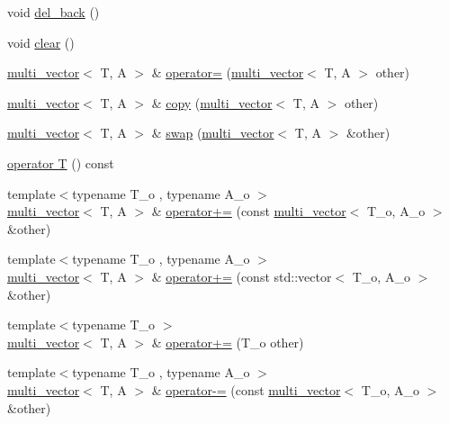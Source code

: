 \begin{DoxyCompactItemize}
\item 
void \hyperlink{classIceBRG_1_1multi__vector_accc4290ed0ee20edf847e26805cd54f2}{del\+\_\+back} ()
\item 
void \hyperlink{classIceBRG_1_1multi__vector_a12b96cd198798ebb0506dbf1b0475c57}{clear} ()
\item 
\hyperlink{classIceBRG_1_1multi__vector}{multi\+\_\+vector}$<$ T, A $>$ \& \hyperlink{classIceBRG_1_1multi__vector_abcfd8d5fcc0c020f3b2df4a7e9f8a86d}{operator=} (\hyperlink{classIceBRG_1_1multi__vector}{multi\+\_\+vector}$<$ T, A $>$ other)
\item 
\hyperlink{classIceBRG_1_1multi__vector}{multi\+\_\+vector}$<$ T, A $>$ \& \hyperlink{classIceBRG_1_1multi__vector_a92c909bfd31a10254ec5c490283bff73}{copy} (\hyperlink{classIceBRG_1_1multi__vector}{multi\+\_\+vector}$<$ T, A $>$ other)
\item 
\hyperlink{classIceBRG_1_1multi__vector}{multi\+\_\+vector}$<$ T, A $>$ \& \hyperlink{classIceBRG_1_1multi__vector_ade66bbf2a7c88dab7578117828cbf51a}{swap} (\hyperlink{classIceBRG_1_1multi__vector}{multi\+\_\+vector}$<$ T, A $>$ \&other)
\item 
\hyperlink{classIceBRG_1_1multi__vector_a94d3f4a0aeb3e0a10deff3facab26ead}{operator T} () const 
\item 
{\footnotesize template$<$typename T\+\_\+o , typename A\+\_\+o $>$ }\\\hyperlink{classIceBRG_1_1multi__vector}{multi\+\_\+vector}$<$ T, A $>$ \& \hyperlink{classIceBRG_1_1multi__vector_ac98362c51641079300aea3e0e7b2c394}{operator+=} (const \hyperlink{classIceBRG_1_1multi__vector}{multi\+\_\+vector}$<$ T\+\_\+o, A\+\_\+o $>$ \&other)
\item 
{\footnotesize template$<$typename T\+\_\+o , typename A\+\_\+o $>$ }\\\hyperlink{classIceBRG_1_1multi__vector}{multi\+\_\+vector}$<$ T, A $>$ \& \hyperlink{classIceBRG_1_1multi__vector_a33e36547fa2a5a016652287d38b23eb1}{operator+=} (const std\+::vector$<$ T\+\_\+o, A\+\_\+o $>$ \&other)
\item 
{\footnotesize template$<$typename T\+\_\+o $>$ }\\\hyperlink{classIceBRG_1_1multi__vector}{multi\+\_\+vector}$<$ T, A $>$ \& \hyperlink{classIceBRG_1_1multi__vector_a100c7fe9b7eb28552d61ad9670da560b}{operator+=} (T\+\_\+o other)
\item 
{\footnotesize template$<$typename T\+\_\+o , typename A\+\_\+o $>$ }\\\hyperlink{classIceBRG_1_1multi__vector}{multi\+\_\+vector}$<$ T, A $>$ \& \hyperlink{classIceBRG_1_1multi__vector_a1f8e2ea7d8cfbe4dab3a00d83dfc057f}{operator-\/=} (const \hyperlink{classIceBRG_1_1multi__vector}{multi\+\_\+vector}$<$ T\+\_\+o, A\+\_\+o $>$ \&other)

\end{DoxyCompactItemize}
